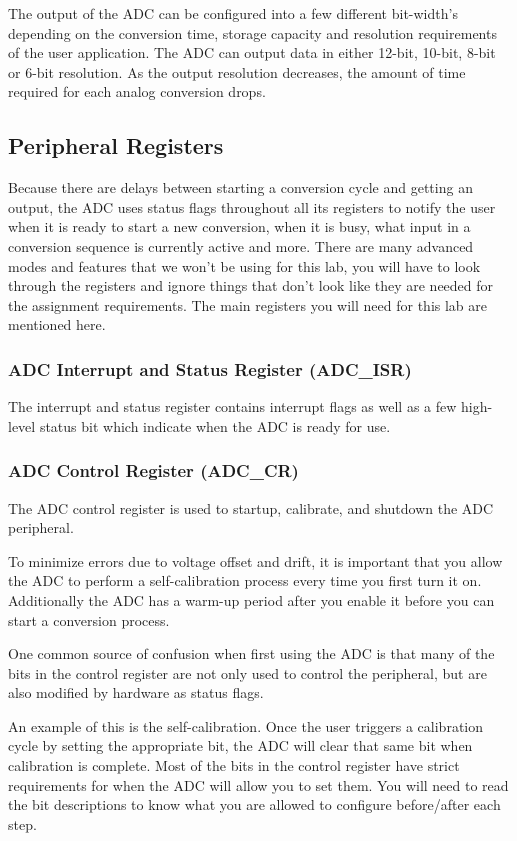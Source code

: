 \documentclass[11pt,fleqn]{book} %
\begin{document}
The output of the ADC can be configured into a few different bit-width's depending on the conversion time, storage capacity and resolution requirements of the user application. The ADC can output data in either 12-bit, 10-bit, 8-bit or 6-bit resolution. As the output resolution decreases, the amount of time required for each analog conversion drops.

\subsection{Peripheral Registers}
Because there are delays between starting a conversion cycle and getting an output, the ADC uses status flags throughout all its registers to notify the user when it is ready to start a new conversion, when it is busy, what input in a conversion sequence is currently active and more. There are many advanced modes and features that we won't be using for this lab, you will have to look through the registers and ignore things that don't look like they are needed for the assignment requirements. The main registers you will need for this lab are mentioned here.

\subsubsection{ADC Interrupt and Status Register (ADC\_ISR)}
The interrupt and status register contains interrupt flags as well as a few high-level status bit which indicate when the ADC is ready for use. 

\subsubsection{ADC Control Register (ADC\_CR)}
The ADC control register is used to startup, calibrate, and shutdown the ADC peripheral. 

To minimize errors due to voltage offset and drift, it is important that you allow the ADC to perform a self-calibration process every time you first turn it on. Additionally the ADC has a warm-up period after you enable it before you can start a conversion process. 

\begin{warning}
    One common source of confusion when first using the ADC is that many of the bits in the control register are not only used to control the peripheral, but are also modified by hardware as status flags. 
      
    An example of this is the self-calibration. Once the user triggers a calibration cycle by setting the appropriate bit, the ADC will clear that same bit when calibration is complete. Most of the bits in the control register have strict requirements for when the ADC will allow you to set them. You will need to read the bit descriptions to know what you are allowed to configure before/after each step.
\end{warning}    
\end{document}
